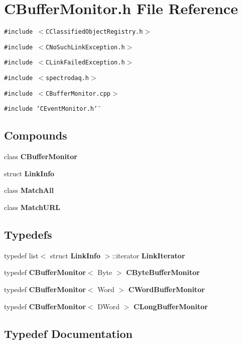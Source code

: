 \section{CBuffer\-Monitor.h File Reference}
\label{CBufferMonitor_8h}
{\tt \#include $<$CClassified\-Object\-Registry.h$>$}\par
{\tt \#include $<$CNo\-Such\-Link\-Exception.h$>$}\par
{\tt \#include $<$CLink\-Failed\-Exception.h$>$}\par
{\tt \#include $<$spectrodaq.h$>$}\par
{\tt \#include $<$CBuffer\-Monitor.cpp$>$}\par
{\tt \#include \char`\"{}CEvent\-Monitor.h\char`\"{}}\par
\subsection*{Compounds}
\begin{CompactItemize}
\item 
class {\bf CBuffer\-Monitor}
\item 
struct {\bf Link\-Info}
\item 
class {\bf Match\-All}
\item 
class {\bf Match\-URL}
\end{CompactItemize}
\subsection*{Typedefs}
\begin{CompactItemize}
\item 
typedef list$<$ struct {\bf Link\-Info} $>$::iterator {\bf Link\-Iterator}
\item 
typedef {\bf CBuffer\-Monitor}$<$ Byte $>$ {\bf CByte\-Buffer\-Monitor}
\item 
typedef {\bf CBuffer\-Monitor}$<$ Word $>$ {\bf CWord\-Buffer\-Monitor}
\item 
typedef {\bf CBuffer\-Monitor}$<$ DWord $>$ {\bf CLong\-Buffer\-Monitor}
\end{CompactItemize}


\subsection{Typedef Documentation}

